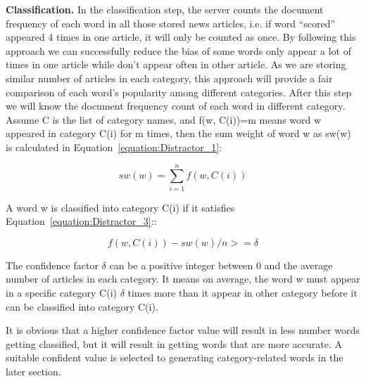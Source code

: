 {\bf Classification.}
In the classification step, the server counts the document frequency of each word in all those stored news articles, i.e. if word “scored” appeared 4 times in one article, it will only be counted as once. By following this approach we can successfully reduce the bias of some words only appear a lot of times in one article while don’t appear often in other article. As we are storing similar number of articles in each category, this approach will provide a fair comparison of each word’s popularity among different categories. After this step we will know the document frequency count of each word in different category. 
Assume C is the list of category names, and f(w, C(i))=m means word w appeared in category C(i) for m times, then the sum weight of word w as sw(w) is calculated in Equation~\ref{equation:Distractor_1}:

\begin{equation}
sw (w) = \sum_{i=1}^{n} f(w,C(i))
\label{equation:Distractor_1}
\end{equation}  

A word w is classified into category C(i) if it satisfies Equation~\ref{equation:Distractor_3}::

\begin{equation}
f (w, C(i)) - sw(w)/n >= \delta
\label{equation:Distractor_3} 
\end{equation}  

The confidence factor $\delta$ can be a positive integer between 0 and the average number of articles in each category. It means on average, the word w must appear in a specific category C(i) $\delta$ times more than it appear in other category before it can be classified into category C(i).

It is obvious that a higher confidence factor value will result in less number words getting classified, but it will result in getting words that are more accurate. A suitable confident value is selected to generating category-related words in the later section.





